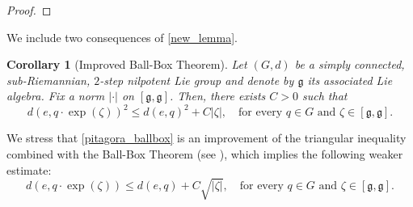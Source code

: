 \documentclass[a4paper,11pt,reqno]{amsart}
\theoremstyle{plain}
\newtheorem{corollary}[theorem]{Corollary}
\theoremstyle{definition}
\newcommand{\g}{\mathfrak{g}}
\newcommand{\id}{e}
\newcommand{\coloneq}{\coloneqq}
\begin{document}
\begin{proof}
\end{proof}

We include two consequences of \cref{new_lemma}.

\begin{corollary}[Improved Ball-Box Theorem] \label{powerful_lemma}
 Let $(G,d)$ be a simply connected, sub-Riemannian, $2$-step nilpotent Lie group and denote by $\g$ its associated Lie algebra. Fix a norm $\lvert \cdot \rvert$ on $[\g,\g]$. Then, there exists $C>0$ such that
 \begin{equation} \label{pitagora_ballbox}
 d(e,q \cdot \exp(\zeta))^2 \le d(e,q)^2 + C \lvert \zeta \rvert, \quad \text{for every $q \in G$ and $\zeta \in [\g,\g]$.}
 \end{equation}
\end{corollary}
We stress that \eqref{pitagora_ballbox} is an improvement of the triangular inequality combined with the Ball-Box Theorem (see \cite[Theorem~4.3.1]{donne2024metricliegroupscarnotcaratheodory}), which implies the following weaker estimate:
\begin{equation*}
 d(e,q \cdot \exp(\zeta)) \le d(e,q) + C \sqrt{\lvert \zeta \rvert}, \quad \text{for every $q \in G$ and $\zeta \in [\g,\g]$.}
\end{equation*}
\end{document}
